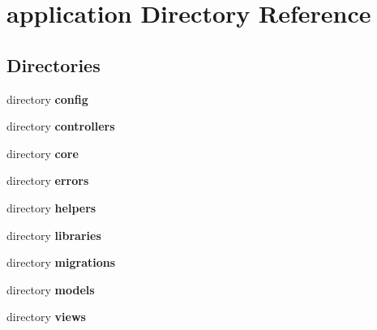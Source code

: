 \section{application Directory Reference}
\label{dir_d75c23162a2652451dce46d2e7e8aead}
\subsection*{Directories}
\begin{DoxyCompactItemize}
\item 
directory {\bf config}
\item 
directory {\bf controllers}
\item 
directory {\bf core}
\item 
directory {\bf errors}
\item 
directory {\bf helpers}
\item 
directory {\bf libraries}
\item 
directory {\bf migrations}
\item 
directory {\bf models}
\item 
directory {\bf views}
\end{DoxyCompactItemize}
